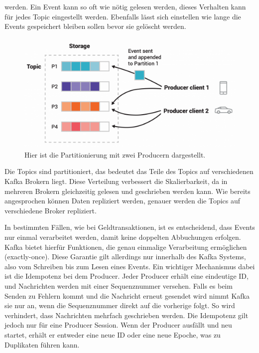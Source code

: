 werden. Ein Event kann so oft wie nötig gelesen werden, dieses Verhalten kann für jedes Topic eingestellt werden. Ebenfalls lässt sich einstellen wie lange die Events gespeichert bleiben sollen bevor sie gelöscht werden. \autocite{ApacheKafka}

\begin{figure}[H]
	\centering
	\includegraphics[width=1\linewidth]{resources/images/partition}
	\caption{Hier ist die Partitionierung mit zwei Producern dargestellt.}
	\label{fig:Partition}
\end{figure}

Die Topics sind partitioniert, das bedeutet das Teile des Topics auf verschiedenen Kafka Brokern liegt. Diese Verteilung verbessert die Skalierbarkeit, da in mehreren Brokern gleichzeitig gelesen und geschrieben werden kann. Wie bereits angesprochen können Daten repliziert werden, genauer werden die Topics auf verschiedene Broker repliziert.

In bestimmten Fällen, wie bei Geldtransaktionen, ist es entscheidend, dass Events nur einmal verarbeitet werden, damit keine doppelten Abbuchungen erfolgen. Kafka bietet hierfür Funktionen, die genau einmalige Verarbeitung ermöglichen (exactly-once). Diese Garantie gilt allerdings nur innerhalb des Kafka Systems, also vom Schreiben bis zum Lesen eines Events. Ein wichtiger Mechanismus dabei ist die Idempotenz bei dem Producer. Jeder Producer erhält eine eindeutige ID, und Nachrichten werden mit einer Sequenznummer versehen. Falls es beim Senden zu Fehlern kommt und die Nachricht erneut gesendet wird nimmt Kafka sie nur an, wenn die Sequenznummer direkt auf die vorherige folgt. So wird verhindert, dass Nachrichten mehrfach geschrieben werden. Die Idempotenz gilt jedoch nur für eine Producer Session. Wenn der Producer ausfällt und neu startet, erhält er entweder eine neue ID oder eine neue Epoche, was zu Duplikaten führen kann.


